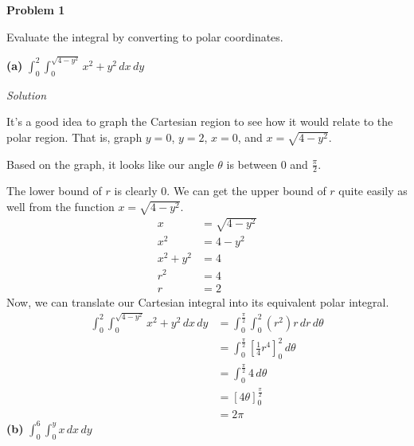 \documentclass{article}
\newcommand{\lrb}[1]{\left[ #1 \right]}
\newcommand{\Solution}{\textit{Solution}}
\begin{document}
\textbf{Problem 1}

Evaluate the integral by converting to polar coordinates.

\textbf{(a)} $\displaystyle\int_0^2\int_0^{\sqrt{4-y^2}}x^2+y^2\,dx\,dy$

\Solution

It's a good idea to graph the Cartesian region to see how it would relate to the polar region. That is, graph $y=0$, $y=2$, $x=0$, and $x=\sqrt{4-y^2}$.
\begin{center}
\end{center}
Based on the graph, it looks like our angle $\theta$ is between $0$ and $\displaystyle\frac{\pi}{2}$.

The lower bound of $r$ is clearly $0$. We can get the upper bound of $r$ quite easily as well from the function $x=\sqrt{4-y^2}$.
\begin{align*}
    x&=\sqrt{4-y^2}\\
    x^2&=4-y^2\\
    x^2+y^2&=4\\
    r^2&=4\tag{in polar, $x^2+y^2=r^2$}\\
    r&=2\tag{keep positive $r$}
\end{align*}
Now, we can translate our Cartesian integral into its equivalent polar integral.
\begin{align*}
\int_0^2\int_0^{\sqrt{4-y^2}}x^2+y^2\,dx\,dy&=\int_0^{\frac{\pi}{2}}\int_0^{2}(r^2)r\,dr\,d\theta\tag{in polar, $x^2+y^2=r^2$}\\
&=\int_0^{\frac{\pi}{2}}\lrb{\frac{1}{4}r^4}_0^2\,d\theta\\
&=\int_0^{\frac{\pi}{2}}4\,d\theta\\
&=\lrb{4\theta}_0^{\frac{\pi}{2}}\\
&=\boxed{2\pi}
\end{align*}
\textbf{(b)} $\displaystyle\int_0^6\int_0^yx\,dx\,dy$
\end{document}
